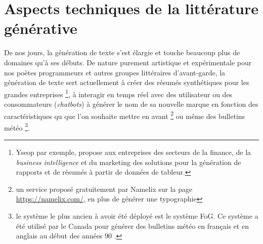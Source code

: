 \documentclass{article}
\begin{document}
				
				
				
				
				
				
				
				
				
				
				
			
				
				

				
				
	

		\newpage
	\section{Aspects techniques de la littérature générative}\label{aspects_tech}
		De nos jours, la génération de texte s'est élargie et touche beaucoup plus de domaines qu'à ses débuts. De nature purement artistique et expérimentale pour nos poètes programmeurs et autres groupes littéraires d'avant-garde, la génération de texte sert actuellement à créer des résumés synthétiques pour les grandes entreprises \footnote{Yseop par exemple, propose aux entreprises des secteurs de la finance, de la \textit{business intelligence} et du marketing des solutions pour la génération de rapports et de résumés à partir de données de tableur.}, à interagir en temps réel avec des utilisateur ou des consommateurs (\textit{chatbots}) à générer le nom de sa nouvelle marque en fonction des caractéristiques qu que l'on souhaite  mettre en avant \footnote{un service proposé gratuitement par Namelix sur la page \href{https://namelix.com/}{https://namelix.com/}, en plus de générer une typographie} ou même des bulletins météo \footnote{le système le plus ancien à avoir été déployé est le système FoG. Ce système a été utilisé par le Canada pour générer des bulletins météo en français et en anglais au début des années 90 \cite{wiki:fog}.}.\\
		
\end{document}
